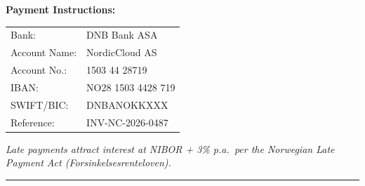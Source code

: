 \documentclass[a4paper,11pt]{article}
\begin{document}
\vspace{16pt}

\noindent\textbf{\textcolor{brand}{Payment Instructions:}}\\[4pt]
\begin{tabular}{ll}
  Bank:           & DNB Bank ASA \\
  Account Name:   & NordicCloud AS \\
  Account No.:    & 1503 44 28719 \\
  IBAN:           & NO28 1503 4428 719 \\
  SWIFT/BIC:      & DNBANOKKXXX \\
  Reference:      & INV-NC-2026-0487 \\
\end{tabular}

\vspace{12pt}
\noindent\textit{\small Late payments attract interest at NIBOR + 3\% p.a.\ per the Norwegian Late Payment Act (Forsinkelsesrenteloven).}

\vspace{20pt}
\noindent\rule{\textwidth}{0.5pt}\\[4pt]
\end{document}
